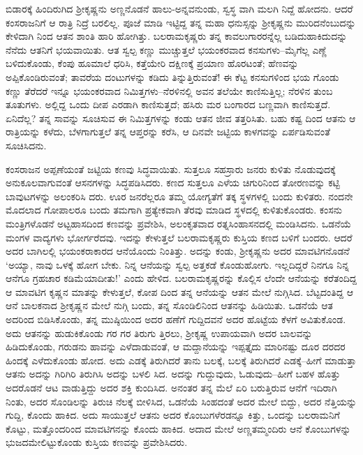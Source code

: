 ಬಿಡಾರಕ್ಕೆ ಹಿಂದಿರುಗಿದ ಶ್ರೀಕೃಷ್ಣನು ಅಣ್ಣನೊಡನೆ ಹಾಲು-ಅನ್ನವನುಂಡು, ಸ್ವಸ್ಥ ವಾಗಿ ಮಲಗಿ ನಿದ್ದೆ ಹೋದನು. ಆದರೆ ಕಂಸರಾಜನಿಗೆ ಆ ರಾತ್ರಿ ನಿದ್ರೆ ಬರಲಿಲ್ಲ. ಪೂಜೆ ಮಾಡಿ ಇಟ್ಟಿದ್ದ ತನ್ನ ಮಹಾ ಧನುಸ್ಸನ್ನು ಶ್ರೀಕೃಷ್ಣನು ಮುರಿದನೆಂಬುದನ್ನು ಕೇಳಿದಾಗಿ ನಿಂದ ಆತನ ಶಾಂತಿ ಹಾರಿ ಹೋಗಿತ್ತು. ಬಲರಾಮಕೃಷ್ಣರು ತನ್ನ ಕಾವಲುಗಾರರನ್ನೆಲ್ಲ ಬಡಿದುಹಾಕಿದುದನ್ನು ನೆನೆದು ಆತನಿಗೆ ಭಯವಾಯಿತು. ಆತ ಸ್ವಲ್ಪ ಕಣ್ಣು ಮುಚ್ಚುತ್ತಲೆ ಭಯಂಕರವಾದ ಕನಸುಗಳು–ಮೈಗೆಲ್ಲ ಎಣ್ಣೆ ಬಳಿದುಕೊಂಡು, ಕೆಂಪು ಹೂಮಾಲೆ ಧರಿಸಿ, ಕತ್ತೆಯೇರಿ ದಕ್ಷಿಣಕ್ಕೆ ಪ್ರಯಾಣ ಹೊರಟಂತೆ; ಹೆಣವನ್ನು ಅಪ್ಪಿಕೊಂಡಿರುವಂತೆ; ತಾವರೆಯ ದಂಟುಗಳನ್ನು ಕಡಿದು ತಿನ್ನುತ್ತಿರುವಂತೆ! ಈ ಕೆಟ್ಟ ಕನಸುಗಳಿಂದ ಭಯ ಗೊಂಡು ಕಣ್ಣು ತೆರೆದರೆ ಇನ್ನೂ ಭಯಂಕರವಾದ ನಿಮಿತ್ತಗಳು–ನೆರಳಿನಲ್ಲಿ ಅವನ ತಲೆಯೇ ಕಾಣಿಸುತ್ತಿಲ್ಲ; ನೆರಳಿನ ತುಂಬ ತೂತುಗಳು. ಅಲ್ಲಿದ್ದ ಒಂದು ದೀಪ ಎರಡಾಗಿ ಕಾಣಿಸುತ್ತದೆ; ಹಸಿರು ಮರ ಬಂಗಾರದ ಬಣ್ಣವಾಗಿ ಕಾಣಿಸುತ್ತದೆ. ಏನಿದೆಲ್ಲ? ತನ್ನ ಸಾವನ್ನು ಸೂಚಿಸುವ ಈ ನಿಮಿತ್ತಗಳನ್ನು ಕಂಡು ಆತನ ಜೀವ ತತ್ತರಿಸಿತು. ಬಹು ಕಷ್ಟ ದಿಂದ ಆತನು ಆ ರಾತ್ರಿಯನ್ನು ಕಳೆದು, ಬೆಳಗಾಗುತ್ತಲೆ ತನ್ನ ಆಪ್ತರನ್ನು ಕರೆಸಿ, ಆ ದಿನವೇ ಜಟ್ಟಿಯ ಕಾಳಗವನ್ನು ಏರ್ಪಡಿಸುವಂತೆ ಸೂಚಿಸಿದನು.

ಕಂಸರಾಜನ ಅಪ್ಪಣೆಯಂತೆ ಜಟ್ಟಿಯ ಕಣವು ಸಿದ್ಧವಾಯಿತು. ಸುತ್ತಲೂ ಸಹಸ್ರಾರು ಜನರು ಕುಳಿತು ನೊಡುವುದಕ್ಕೆ ಅನುಕೂಲವಾಗುವಂತೆ ಆಸನಗಳನ್ನು ಸಿದ್ಧಪಡಿಸಿದರು. ಕಣದ ಸುತ್ತಲೂ ಎಳೆಯ ಚಿಗುರಿನಿಂದ ತೋರಣವನ್ನು ಕಟ್ಟಿ ಬಾವುಟಗಳನ್ನು ಅಲಂಕರಿಸಿ ದರು. ಊರ ಜನರೆಲ್ಲರೂ ತಮ್ಮ ಯೋಗ್ಯತೆಗೆ ತಕ್ಕ ಸ್ಥಳಗಳಲ್ಲಿ ಬಂದು ಕುಳಿತರು. ನಂದನೇ ಮೊದಲಾದ ಗೋಪಾಲರೂ ಬಂದು ತಮಗಾಗಿ ಪ್ರತ್ಯೇಕವಾಗಿ ತೆರವು ಮಾಡಿದ ಸ್ಥಳದಲ್ಲಿ ಕುಳಿತುಕೊಂಡರು. ಕಂಸನು ಮಂತ್ರಿಗಳೊಡನೆ ಅಟ್ಟಹಾಸದಿಂದ ಕಣವನ್ನು ಪ್ರವೇಶಿಸಿ, ಅಲಂಕೃತವಾದ ರತ್ನಸಿಂಹಾಸನದಲ್ಲಿ ಮಂಡಿಸಿದನು. ಒಡನೆಯೆ ಮಂಗಳ ವಾದ್ಯಗಳು ಭೋರ್ಗರೆದವು. ಇದನ್ನು ಕೇಳುತ್ತಲೆ ಬಲರಾಮಕೃಷ್ಣರು ಕುಸ್ತಿಯ ಕಣದ ಬಳಿಗೆ ಬಂದರು. ಆದರೆ ಅದರ ಬಾಗಿಲಲ್ಲಿ ಭಯಂಕರಾಕಾರದ ಆನೆಯೊಂದು ನಿಂತಿತ್ತು. ಅದನ್ನು ಕಂಡು, ಶ್ರೀಕೃಷ್ಣನು ಅದರ ಮಾವಟಿಗನೊಡನೆ ‘ಅಯ್ಯಾ, ನಾವು ಒಳಕ್ಕೆ ಹೋಗ ಬೇಕು. ನಿನ್ನ ಆನೆಯನ್ನು ಸ್ವಲ್ಪ ಅತ್ತಕಡೆ ಕೊಂಡುಹೋಗು. ಇಲ್ಲದಿದ್ದರೆ ನಿನಗೂ ನಿನ್ನ ಆನೆಗೂ ಗ್ರಹಚಾರ ಕಡಿಮೆಯಾದೀತು!’ ಎಂದು ಹೇಳಿದ. ಬಲರಾಮಕೃಷ್ಣರನ್ನು ಕೊಲ್ಲಿಸ ಲೆಂದೇ ಆನೆಯನ್ನು ಕರೆತಂದಿದ್ದ ಆ ಮಾವಟಿಗ ಕೃಷ್ಣನ ಮಾತನ್ನು ಕೇಳುತ್ತಲೆ, ಕೋಪ ದಿಂದ ತನ್ನ ಆನೆಯನ್ನು ಆತನ ಮೇಲೆ ನುಗ್ಗಿಸಿದ. ಬೆಟ್ಟದಂತಿದ್ದ ಆ ಆನೆ ಬಾಲಕನಾದ ಶ್ರೀಕೃಷ್ಣನ ಮೇಲೆ ನುಗ್ಗಿ ಬಂದು, ತನ್ನ ಸೊಂಡಿಲಿನಿಂದ ಆತನನ್ನು ಹಿಡಿಯಿತು. ಒಡನೆಯೆ ಆತ ಅದರಿಂದ ಬಿಡಿಸಿಕೊಂಡು, ತನ್ನ ಮುಷ್ಠಿಯಿಂದ ಅದರ ಹಣೆಗೆ ಗುದ್ದಿದವನೆ ಅದರ ಹೊಟ್ಟೆಯ ಕೆಳಗೆ ಅವಿತುಕೊಂಡ. ಅದು ಆತನನ್ನು ಹುಡುಕಿಕೊಂಡು ಗರ ಗರ ತಿರುಗು ತ್ತಿರಲು, ಶ್ರೀಕೃಷ್ಣ ಉಪಾಯವಾಗಿ ಅದರ ಬಾಲವನ್ನು ಹಿಡಿದುಕೊಂಡು, ಗರುಡನು ಹಾವನ್ನು ಎಳೆದಾಡುವಂತೆ, ಆ ಮದ್ದಾನೆಯನ್ನು ಇಪ್ಪತ್ತೈದು ಮಾರಿನಷ್ಟು ದೂರ ದರದರ ಹಿಂದಕ್ಕೆ ಎಳೆದುಕೊಂಡು ಹೋದ. ಅದು ಎಡಕ್ಕೆ ತಿರುಗಿದರೆ ತಾನು ಬಲಕ್ಕೆ, ಬಲಕ್ಕೆ ತಿರುಗಿದರೆ ಎಡಕ್ಕೆ–ಹೀಗೆ ಮಾಡುತ್ತಾ ಆತನು ಅದನ್ನು ಗಿರಿಗಿರಿ ತಿರುಗಿಸಿ ಅದನ್ನು ಬಳಲಿ ಸಿದ. ಅದನ್ನು ಗುದ್ದುವುದು, ಓಡುವುದು–ಹೀಗೆ ಬಹಳ ಹೊತ್ತು ಅದರೊಡನೆ ಆಟ ವಾಡುತ್ತಿದ್ದು ಅದರ ಶಕ್ತಿ ಕುಂದಿಸಿದ. ಅನಂತರ ತನ್ನ ಮೆಲೆ ಏರಿ ಬರುತ್ತಿರುವ ಆನೆಗೆ ಇದಿರಾಗಿ ನಿಂತು, ಅದರ ಸೊಂಡಿಲನ್ನು ತಿರುಚಿ ನೆಲಕ್ಕೆ ಬೀಳಿಸಿದ, ಒಡನೆಯೆ ಸಿಂಹದಂತೆ ಅದರ ಮೇಲೆ ಬಿದ್ದು, ಅದರ ನೆತ್ತಿಯನ್ನು ಗುದ್ದಿ, ಕೊಂದು ಹಾಕಿದ. ಅದು ಸಾಯುತ್ತಲೆ ಆತನು ಅದರ ಕೊಂಬುಗಳೆರಡನ್ನೂ ಕಿತ್ತು, ಒಂದನ್ನು ಬಲರಾಮನಿಗೆ ಕೊಟ್ಟು, ಮತ್ತೊಂದರಿಂದ ಮಾವಟಿಗನನ್ನು ಕೊಂದು ಹಾಕಿದ. ಅದಾದ ಮೇಲೆ ಅಣ್ಣತಮ್ಮಂದಿರು ಆನೆ ಕೊಂಬುಗಳನ್ನು ಭುಜದಮೇಲಿಟ್ಟುಕೊಂಡು ಕುಸ್ತಿಯ ಕಣವನ್ನು ಪ್ರವೇಶಿಸಿದರು.

